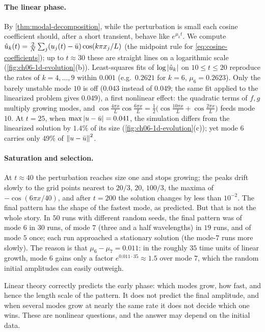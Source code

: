 \paragraph{The linear phase.}
By \cref{thm:modal-decomposition}, while the perturbation is small each cosine
coefficient should, after a short transient, behave like $e^{\mu_kt}$. We compute
$\hat u_k(t)=\frac2N\sum_j(u_j(t)-\bar u)\cos(k\pi x_j/L)$ (the midpoint rule for
\eqref{eq:cosine-coefficients}); up to $t\approx30$ these are straight lines on a
logarithmic scale (\cref{fig:ch06-1d-evolution}(b)). Least-squares fits of
$\log\left\lvert \hat u_k\right\rvert$ on $10\le t\le20$ reproduce the rates of $k=4,\dots,9$ within
$0.001$ (e.g.\ $0.2621$ for $k=6$, $\mu_6=0.2623$). Only the barely unstable mode $10$
is off ($0.043$ instead of $0.049$; the same fit applied to the linearized problem
gives $0.049$), a first nonlinear effect: the quadratic terms of $f,g$ multiply growing
modes, and $\cos\frac{4\pi x}{L}\cos\frac{6\pi x}{L}=\frac12\big(\cos\frac{10\pi x}{L}
+\cos\frac{2\pi x}{L}\big)$ feeds mode $10$. At $t=25$, when $\max\left\lvert u-\bar u\right\rvert=0.041$,
the simulation differs from the linearized solution by $1.4\%$ of its size
(\cref{fig:ch06-1d-evolution}(c)); yet mode $6$ carries only $49\%$ of
$\left\lVert u-\bar u\right\rVert^2$.

\paragraph{Saturation and selection.}
At $t\approx40$ the perturbation reaches size one and stops growing; the peaks drift
slowly to the grid points nearest to $20/3$, $20$, $100/3$, the maxima of
$-\cos(6\pi x/40)$, and after
$t=200$ the solution changes by less than $10^{-2}$. The final pattern has the shape
of the fastest mode, as predicted. But that is not the whole story. In $50$ runs with
different random seeds, the final pattern was of mode $6$ in $30$ runs, of mode $7$
(three and a half wavelengths) in $19$ runs, and of mode $5$ once; each run
approached a stationary solution (the mode-$7$ runs more slowly). The reason
is that $\mu_6-\mu_7=0.011$: in the roughly $35$ time units of linear growth, mode $6$
gains only a factor $e^{0.011\cdot35}\approx1.5$ over mode $7$, which the random initial
amplitudes can easily outweigh.

\begin{keyidea}
Linear theory correctly predicts the early phase: which modes grow, how fast, and
hence the length scale of the pattern. It does not predict the final amplitude, and
when several modes grow at nearly the same rate it does not decide which one wins.
These are nonlinear questions, and the answer may depend on the initial data.
\end{keyidea}

